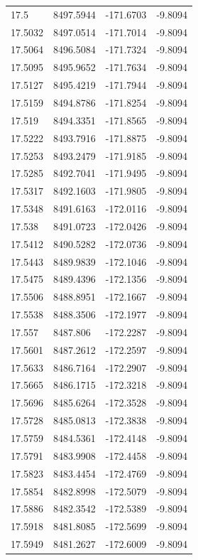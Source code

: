\begin{table}[H]
\begin{tabular}{llll}
17.5 & 8497.5944 & -171.6703 & -9.8094 \\
17.5032 & 8497.0514 & -171.7014 & -9.8094 \\
17.5064 & 8496.5084 & -171.7324 & -9.8094 \\
17.5095 & 8495.9652 & -171.7634 & -9.8094 \\
17.5127 & 8495.4219 & -171.7944 & -9.8094 \\
17.5159 & 8494.8786 & -171.8254 & -9.8094 \\
17.519 & 8494.3351 & -171.8565 & -9.8094 \\
17.5222 & 8493.7916 & -171.8875 & -9.8094 \\
17.5253 & 8493.2479 & -171.9185 & -9.8094 \\
17.5285 & 8492.7041 & -171.9495 & -9.8094 \\
17.5317 & 8492.1603 & -171.9805 & -9.8094 \\
17.5348 & 8491.6163 & -172.0116 & -9.8094 \\
17.538 & 8491.0723 & -172.0426 & -9.8094 \\
17.5412 & 8490.5282 & -172.0736 & -9.8094 \\
17.5443 & 8489.9839 & -172.1046 & -9.8094 \\
17.5475 & 8489.4396 & -172.1356 & -9.8094 \\
17.5506 & 8488.8951 & -172.1667 & -9.8094 \\
17.5538 & 8488.3506 & -172.1977 & -9.8094 \\
17.557 & 8487.806 & -172.2287 & -9.8094 \\
17.5601 & 8487.2612 & -172.2597 & -9.8094 \\
17.5633 & 8486.7164 & -172.2907 & -9.8094 \\
17.5665 & 8486.1715 & -172.3218 & -9.8094 \\
17.5696 & 8485.6264 & -172.3528 & -9.8094 \\
17.5728 & 8485.0813 & -172.3838 & -9.8094 \\
17.5759 & 8484.5361 & -172.4148 & -9.8094 \\
17.5791 & 8483.9908 & -172.4458 & -9.8094 \\
17.5823 & 8483.4454 & -172.4769 & -9.8094 \\
17.5854 & 8482.8998 & -172.5079 & -9.8094 \\
17.5886 & 8482.3542 & -172.5389 & -9.8094 \\
17.5918 & 8481.8085 & -172.5699 & -9.8094 \\
17.5949 & 8481.2627 & -172.6009 & -9.8094 \\

\end{tabular}
\end{table}
